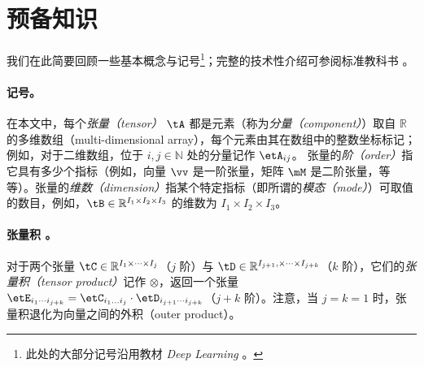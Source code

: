 \section{预备知识}
\label{sec:preliminaries}
我们在此简要回顾一些基本概念与记号\footnote{此处的大部分记号沿用教材 \textit{Deep Learning}
\cite{goodfellow2016deep}。}；完整的技术性介绍可参阅标准教科书 \cite{BI20221, 10.5555/1643460}。


\paragraph{记号。}在本文中，每个\textit{张量（tensor）} $\tA$ 都是元素（称为\emph{分量（component）}）取自 $\mathbb{R}$ 的多维数组（multi-dimensional array），每个元素由其在数组中的整数坐标标记；例如，对于二维数组，位于 $i,j \in \mathbb{N}$ 处的分量记作 $\etA_{ij}$。
 张量的\emph{阶（order）}指它具有多少个指标（例如，向量 $\vv$ 是一阶张量，矩阵 $\mM$ 是二阶张量，等等）。张量的\emph{维数（dimension）}指某个特定指标（即所谓的\textit{模态（mode）}）可取值的数目，例如，$\tB \in \mathbb{R}^{I_1 \times I_2 \times I_3}$ 的维数为 $I_1 \times I_2 \times I_3$。

\paragraph{张量积 \cite{cohen2016expressive}。}对于两个张量 $\tC \in \mathbb{R}^{I_1 \times \cdots \times I_j}$（$j$ 阶）与 $\tD \in \mathbb{R}^{I_{j+1}, \times \cdots \times I_{j+k}}$（$k$ 阶），它们的\textit{张量积（tensor product）}记作 $\otimes$，返回一个张量 $\etE_{i_1 \cdots i_{j+k}} = \etC_{i_1...i_j} \cdot \etD_{i_{j+1} \cdots i_{j+k}}$（$j+k$ 阶）。注意，当 $j = k = 1$ 时，张量积退化为向量之间的外积（outer product）。

